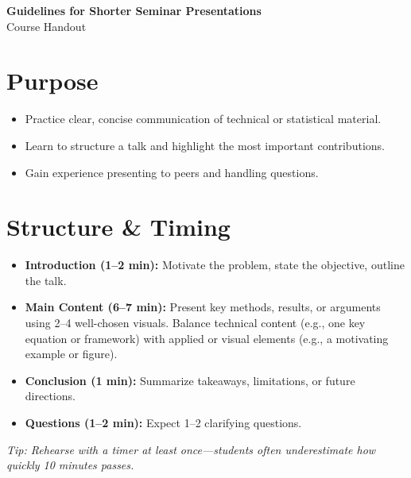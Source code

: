 \documentclass[11pt]{article}
\begin{document}
\begin{center}
    \Large \textbf{Guidelines for Shorter Seminar Presentations} \\
    \normalsize Course Handout
\end{center}

\vspace{1em}

\section*{Purpose}
\begin{itemize}
    \item Practice clear, concise communication of technical or statistical material.
    \item Learn to structure a talk and highlight the most important contributions.
    \item Gain experience presenting to peers and handling questions.
\end{itemize}

\section*{Structure \& Timing}
\begin{itemize}
    \item \textbf{Introduction (1--2 min):} Motivate the problem, state the objective, outline the talk.
    \item \textbf{Main Content (6--7 min):} Present key methods, results, or arguments using 2--4 well-chosen visuals. Balance technical content (e.g., one key equation or framework) with applied or visual elements (e.g., a motivating example or figure).
    \item \textbf{Conclusion (1 min):} Summarize takeaways, limitations, or future directions.
    \item \textbf{Questions (1--2 min):} Expect 1--2 clarifying questions.
\end{itemize}

\textit{Tip: Rehearse with a timer at least once---students often underestimate how quickly 10 minutes passes.}
\end{document}
